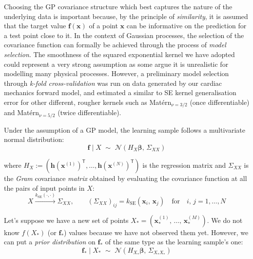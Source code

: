 \vspace{0.2cm}
Choosing the GP covariance structure which best captures the nature of the underlying data is important because, by the principle of \textit{similarity}, it is assumed that the target value $\mathbf{f}(\mathbf{x})$ of a point $\mathbf{x}$ can be informative on the prediction for a test point close to it. In the context of Gaussian processes, the selection of the covariance function can formally be achieved through the process of \textit{model selection}. The smoothness of the squared exponential kernel we have adopted could represent a very strong assumption as some argue it is unrealistic for modelling many physical processes. However, a preliminary model selection through \textit{k-fold cross-validation} was run on data generated by our cardiac mechanics forward model, and estimated a similar to SE kernel generalisation error for other different, rougher kernels such as Mat\'{e}rn$_{\nu=3/2}$ (once differentiable) and Mat\'{e}rn$_{\nu=5/2}$ (twice differentiable).

\vspace{0.2cm}
Under the assumption of a GP model, the learning sample follows a multivariate normal distribution:
%
\begin{equation}
    \mathbf{f}\;\vert\; X \,\,\sim\,\, \mathcal{N}(H_{X}\boldsymbol{\beta},\,\Sigma_{XX})
\end{equation}

\noindent
where $H_{X}:=(\mathbf{h}(\mathbf{x}^{(1)})^\mathsf{T},\dots,\mathbf{h}(\mathbf{x}^{(N)})^\mathsf{T})$ is the regression matrix and $\Sigma_{XX}$ is the \textit{Gram} covariance \textit{matrix} obtained by evaluating the covariance function at all the pairs of input points in $X$:
%
\begin{equation}
    X\xrightarrow{k_{\text{SE}}(\cdot,\cdot)}\Sigma_{XX},\qquad \left(\Sigma_{XX}\right)_{ij} = k_{\text{SE}}(\mathbf{x}_i,\,\mathbf{x}_j)\quad\text{for}\quad i,\,j=1,\dots,N
\end{equation}

\noindent
Let's suppose we have a new set of points $X_{*}=(\mathbf{x}_{*}^{(1)},\,\dots,\,\mathbf{x}_{*}^{(M)})$. We do not know $f(X_{*})$ (or $\mathbf{f}_{*}$) values because we have not observed them yet. However, we can put a \textit{prior distribution} on $\mathbf{f}_{*}$ of the same type as the learning sample's one:
%
\begin{equation}
    \mathbf{f}_{*}\;\vert\; X_{*} \,\,\sim\,\, \mathcal{N}(H_{X_{*}}\boldsymbol{\beta},\,\Sigma_{X_{*}X_{*}})
\end{equation}

